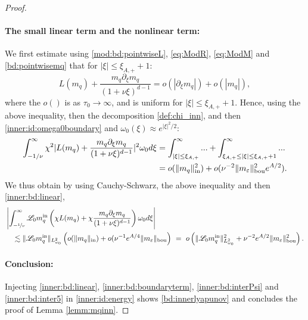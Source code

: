 \documentclass[11pt]{aims}
\theoremstyle{definition}
\newcommand{\Ls}{\mathscr{L}}
\newcommand{\pa}{\partial}
\newcommand{\inn}{\textup{in}}
\newcommand{\bd}{\textup{bou}}
\newcommand{\intb}{\int_{-\nicefrac{1}{\nu}}^\infty}
\numberwithin{equation}{section}
\begin{document}
\begin{proof}
\paragraph{The small linear term and the nonlinear term:} We first estimate using \eqref{mod:bd:pointwiseL}, \eqref{eq:ModR}, \eqref{eq:ModM} and \eqref{bd:pointwisemq} that for $|\xi|\leq \xi_{A,+}+1$:
$$
L(m_q)+ \frac{m_q \pa_\xi m_q}{(1 + \nu\xi)^{d-1}} =o(|\pa_\xi m_q|)+o(|m_q|),
$$
where the $o()$ is as $\tau_0\to \infty$, and is uniform for $|\xi|\leq \xi_{A,+}+1$. Hence, using the above inequality, then the decomposition \eqref{def:chi_inn}, and then \eqref{inner:id:omega0boundary} and $\omega_0(\xi)\approx e^{|\xi|^2/2}$:
\begin{align*}
\int_{-1/\nu}^\infty \chi^2 |L(m_q)+ \frac{m_q \pa_\xi m_q}{(1 + \nu\xi)^{d-1}}|^2\omega_0 d\xi & = \int_{|\xi|\leq \xi_{A,+}}^\infty...+\int_{\xi_{A,+} \leq |\xi|\leq \xi_{A,+}+1 }^\infty... \\
 &=o(\| m_q \|_{\inn}^2)+o(\nu^{-2}\|  m_\varepsilon \|_{\bd}^2 e^{A/2}).
\end{align*}
We thus obtain by using Cauchy-Schwarz, the above inequality and then \eqref{inner:bd:linear},
\begin{align}
 \label{inner:bd:inter5} & \left| \intb \Ls_0 m_q^\inn \left(\chi L(m_q)+ \chi  \frac{m_q \pa_\xi m_q}{(1 + \nu\xi)^{d-1}}\right)\omega_0 d\xi \right| \\
 \nonumber &\quad  \lesssim  \|\Ls_0 m_q^\inn\|_{L^2_{\omega_0}}\left(o(\| m_q \|_{\inn})+o( \nu^{-1}e^{A/4}\|  m_\varepsilon \|_{\bd} \right) \ = \ o\left( \|\Ls_0 m_q^\inn\|_{L^2_{\omega_0}}^2+\nu^{-2}e^{A/2} \| m_\varepsilon \|_{\bd}^2 \right).
\end{align}

\paragraph{Conclusion:} Injecting \eqref{inner:bd:linear}, \eqref{inner:bd:boundaryterm}, \eqref{inner:bd:interPsi} and \eqref{inner:bd:inter5} in \eqref{inner:id:energy} shows \eqref{bd:innerlyapunov} and concludes the proof of Lemma \ref{lemm:mqinn}.
\end{proof}
\end{document}
